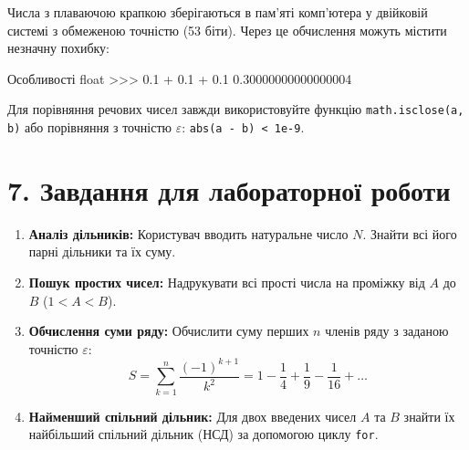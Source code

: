 \documentclass{scrreprt}
\begin{document}
	\begin{tcolorbox}[colback=yellow!10!white,colframe=orange,title=\textbf{Обережно з дійсними числами (float)!},fonttitle=\sffamily\bfseries]
		Числа з плаваючою крапкою зберігаються в пам'яті комп'ютера у двійковій системі з обмеженою точністю (53 біти). Через це обчислення можуть містити незначну похибку:
\begin{py}{Особливості float}
>>> 0.1 + 0.1 + 0.1
0.30000000000000004
\end{py}
		Для порівняння речових чисел завжди використовуйте функцію \texttt{math.isclose(a, b)} або порівняння з точністю $\varepsilon$: \texttt{abs(a - b) < 1e-9}.
	\end{tcolorbox}

	\vspace{0.3cm}

	\section*{7. Завдання для лабораторної роботи}

	\begin{enumerate}[label=\arabic*.]
		\item \textbf{Аналіз дільників:} Користувач вводить натуральне число $N$. Знайти всі його парні дільники та їх суму.
		\item \textbf{Пошук простих чисел:} Надрукувати всі прості числа на проміжку від $A$ до $B$ ($1 < A < B$).
		\item \textbf{Обчислення суми ряду:} Обчислити суму перших $n$ членів ряду з заданою точністю $\varepsilon$:
		$$ S = \sum_{k=1}^{n} \frac{(-1)^{k+1}}{k^2} = 1 - \frac{1}{4} + \frac{1}{9} - \frac{1}{16} + \dots $$
		\item \textbf{Найменший спільний дільник:} Для двох введених чисел $A$ та $B$ знайти їх найбільший спільний дільник (НСД) за допомогою циклу \texttt{for}.
	\end{enumerate}
\end{document}
